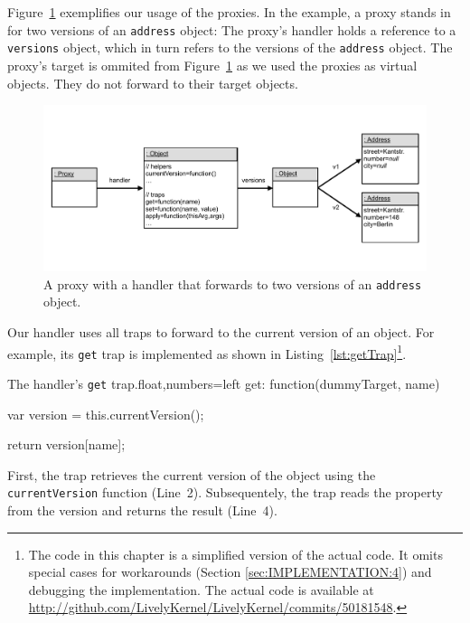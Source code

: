 Figure~\ref{fig:VersioningProxy} exemplifies our usage of the proxies.
In the example, a proxy stands in for two versions of an \lstinline{address} object: The proxy's handler holds a reference to a \lstinline{versions} object, which in turn refers to the versions of the \lstinline{address} object.
The proxy's target is ommited from Figure~\ref{fig:VersioningProxy} as we used the proxies as virtual objects.
They do not forward to their target objects.

\begin{figure}[h]
    \centering
    \includegraphics[width=\textwidth]{figures/5_implementation/2_versioningProxy.pdf}
    \caption{A proxy with a handler that forwards to two versions of an \lstinline{address} object.}
    \label{fig:VersioningProxy}
\end{figure}

Our handler uses all traps to forward to the current version of an object.
For example, its \lstinline{get} trap is implemented as shown in Listing~\ref{lst:getTrap}\footnote{The code in this chapter is a simplified version of the actual code. It omits special cases for workarounds (Section \ref{sec:IMPLEMENTATION:4}) and debugging the implementation. The actual code is available at \url{http://github.com/LivelyKernel/LivelyKernel/commits/50181548}.}.

\begin{code}{The handler's \lstinline{get} trap.}{float,numbers=left}
get: function(dummyTarget, name) {
    var version = this.currentVersion();
    
    return version[name];
}
\end{code}
\iffalse
\end{verbatim}\fi

First, the trap retrieves the current version of the object using the \lstinline{currentVersion} function (Line~2).
Subsequentely, the trap reads the property from the version and returns the result (Line~4).

